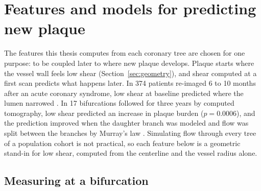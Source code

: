 %
%

\section{Features and models for predicting new plaque}
\label{sec:risk-features}

The features this thesis computes from each coronary tree are chosen for one purpose: to be coupled later to where new plaque develops.
Plaque starts where the vessel wall feels low shear (Section~\ref{sec:geometry}), and shear computed at a first scan predicts what happens later.
In 374 patients re-imaged 6 to 10 months after an acute coronary syndrome, low shear at baseline predicted where the lumen narrowed \cite{stone2012prediction}.
In 17 bifurcations followed for three years by computed tomography, low shear predicted an increase in plaque burden ($p = 0.0006$), and the prediction improved when the daughter branch was modeled and flow was split between the branches by Murray's law \cite{sakellarios2017bifurcation}.
Simulating flow through every tree of a population cohort is not practical, so each feature below is a geometric stand-in for low shear, computed from the centerline and the vessel radius alone.

\subsection{Measuring at a bifurcation}

